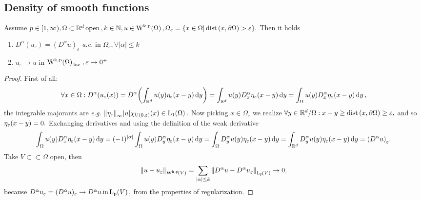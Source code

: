 \documentclass{article}
\begin{document}
\subsection{Density of smooth functions}
\label{sec:density}

\begin{lemma}
	Assume $p \in [1, \infty), \Omega \subset \R^d \, \text{open} \,, k \in \N, u \in \WkpSet{\Omega}, \Omega_{\varepsilon} = \qty{x \in \Omega | \dist\qty(x, \partial \Omega)>\varepsilon}.$ Then it holds
	\begin{enumerate}
		\item $D^\alpha(u_{\varepsilon}) = (D^\alpha u)_{\varepsilon}$ \textit{a.e.} in $\Omega_{\varepsilon}, \forall |\alpha| \leq k$
		\item $u_{\varepsilon}\to u$ in $\WkpSet{\Omega}_{\, \text{loc} \,}, \varepsilon \to 0^+$
	\end{enumerate}
\end{lemma}

\begin{proof}
	First of all: \[
		\forall x \in \Omega: D^{\alpha}\qty(u_{\varepsilon}(x)) = D^{\alpha}\qty(\int_{{\mathbb R}^d}u(y)\eta_{\varepsilon}(x-y)\dd{y}) = \int_{{\mathbb R}^d}u(y)D_x^{\alpha}\eta_{\varepsilon}(x-y)\dd{y} = \int_{\Omega}u(y)D_x^{\alpha}\eta_{\varepsilon}(x-y)\dd{y},
	\]
	the integrable majorants are \textit{e.g.} $\norm{\eta_{\varepsilon}}_{\infty}|u|\chi_{\text{U}(0,\varepsilon)}(x) \in \LpSet[1]{\Omega}.$ Now picking $x \in \Omega_{\varepsilon}$ we realize $\forall y \in {\mathbb R}^d / \Omega: x-y \geq \operatorname{dist}\qty(x,\partial \Omega) \geq \varepsilon,$ and so $\eta_{\varepsilon}\qty(x-y) = 0.$ Exchanging derivatives and using the definition of the weak derivative
	\[
		\int_{\Omega}u(y) D_x^{\alpha}\eta_{\varepsilon}(x-y)\dd{y} =(-1)^{|\alpha|}\int_{\Omega}u(y)D_y^{\alpha}\eta_{\varepsilon}\qty(x-y)\dd{y} = \int_{\Omega}D^{\alpha}_y u(y) \eta_{\varepsilon}(x-y)\dd{y}= \int_{{\mathbb R}^d}D^{\alpha}_y u(y) \eta_{\varepsilon}(x-y)\dd{y} = \qty(D^{\alpha}u)_{\varepsilon}.
	\]
	Take $V \subset \subset \Omega$ open, then
	\[
		\norm{u - u_{\varepsilon}}_{\WkpSet{V}} = \sum_{|\alpha|\leq k}\norm{D^{\alpha}u - D^{\alpha}u_{\varepsilon}}_{\LpSet{V}} \to 0,
	\]
	because $D^{\alpha}u_{\varepsilon} = (D^{\alpha}u)_{\varepsilon} \to D^{\alpha}u \, \text{in} \, \LpSet{V},$ from the properties of regularization.
\end{proof}
\end{document}

